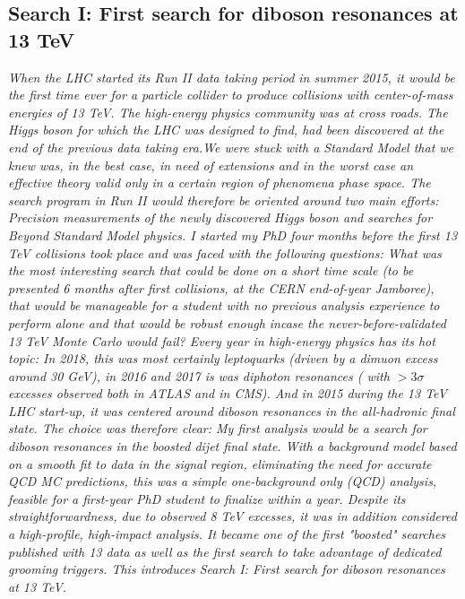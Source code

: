 \vspace*{\fill}
\begin{centering}
\section{Search I: First search for diboson resonances at 13 TeV}
\textit{
When the LHC started its Run II data taking period in summer 2015, it would be the first time ever for a particle collider to produce collisions with center-of-mass energies of 13 TeV. The high-energy physics community was at cross roads. The Higgs boson for which the LHC was designed to find, had been discovered at the end of the previous data taking era.We were stuck with a Standard Model that we knew was, in the best case, in need of extensions and in the worst case an effective theory valid only in a certain region of phenomena phase space. The search program in Run II would therefore be oriented around two main efforts: Precision measurements of the newly discovered Higgs boson and searches for Beyond Standard Model physics.
\newline
\newline
I started my PhD four months before the first 13 TeV collisions took place and was faced with the following questions:
What was the most interesting search that could be done on a short time scale (to be presented 6 months after first collisions, at the CERN end-of-year Jamboree), that would be manageable for a student with no previous analysis experience to perform alone and that would be robust enough incase the never-before-validated 13 TeV Monte Carlo would fail? \newline
\newline
Every year in high-energy physics has its hot topic: In 2018, this was most certainly leptoquarks (driven by a dimuon excess around 30 GeV), in 2016 and 2017 is was diphoton resonances ( with  $>3\sigma$ excesses observed both in ATLAS and in CMS). And in 2015 during the 13 TeV LHC start-up, it was centered around diboson resonances in the all-hadronic final state. The choice was therefore clear: My first analysis would be a search for diboson resonances in the boosted dijet final state. With a background model based on a smooth fit to data in the signal region, eliminating the need for accurate QCD MC predictions, this was a simple one-background only (QCD) analysis, feasible for a first-year PhD student to finalize within a year. Despite its straightforwardness, due to observed 8 TeV excesses, it was in addition considered a high-profile, high-impact analysis.
\newline
\newline
It became one of the first "boosted" searches published with 13 \TeV data as well as the first search to take advantage of dedicated grooming triggers. This introduces Search I: First search for diboson resonances at 13 TeV.
}
\end{centering}
